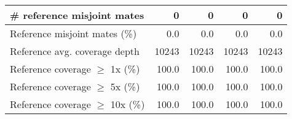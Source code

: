 \documentclass[12pt,a4paper]{article}
\begin{document}
\begin{table}[ht]
\begin{center}
\begin{tabular}{|l*{4}{|r}|}
\# reference misjoint mates & 0 & 0 & 0 & 0 \\ \hline
Reference misjoint mates (\%) & 0.0 & 0.0 & 0.0 & 0.0 \\ \hline
Reference avg. coverage depth & 10243 & 10243 & 10243 & 10243 \\ \hline
Reference coverage $\geq$ 1x (\%) & 100.0 & 100.0 & 100.0 & 100.0 \\ \hline
Reference coverage $\geq$ 5x (\%) & 100.0 & 100.0 & 100.0 & 100.0 \\ \hline
Reference coverage $\geq$ 10x (\%) & 100.0 & 100.0 & 100.0 & 100.0 \\ \hline
\end{tabular}
\end{center}
\end{table}
\end{document}
